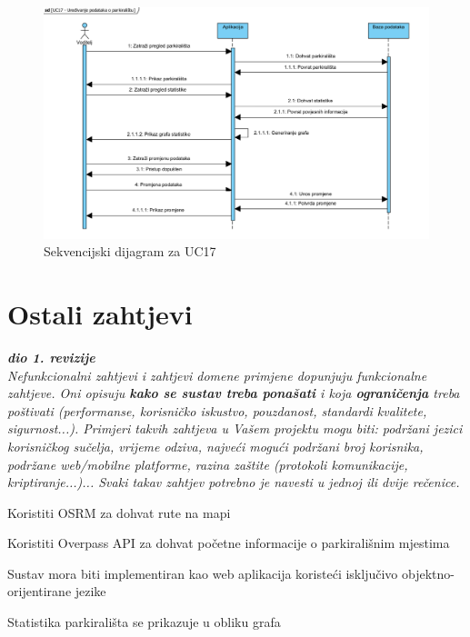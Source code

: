 				\vspace{1cm}
				
				\begin{figure}[H]
					\centering
					\includegraphics[width=\textwidth]{slike/SD_UC17.JPG} 
					\caption{Sekvencijski dijagram za UC17}
					\label{fig:promjene11} 
				\end{figure}
				\eject
	
		\section{Ostali zahtjevi}
		
			\textbf{\textit{dio 1. revizije}}\\
		 
			 \textit{Nefunkcionalni zahtjevi i zahtjevi domene primjene dopunjuju funkcionalne zahtjeve. Oni opisuju \textbf{kako se sustav treba ponašati} i koja \textbf{ograničenja} treba poštivati (performanse, korisničko iskustvo, pouzdanost, standardi kvalitete, sigurnost...). Primjeri takvih zahtjeva u Vašem projektu mogu biti: podržani jezici korisničkog sučelja, vrijeme odziva, najveći mogući podržani broj korisnika, podržane web/mobilne platforme, razina zaštite (protokoli komunikacije, kriptiranje...)... Svaki takav zahtjev potrebno je navesti u jednoj ili dvije rečenice.}
			 \begin{packed_enum}

				\item Koristiti OSRM za dohvat rute na mapi
				\item Koristiti Overpass API za dohvat početne informacije o parkirališnim mjestima
				\item Sustav mora biti implementiran kao web aplikacija koristeći isključivo objektno-orijentirane jezike
				\item Statistika parkirališta se prikazuje u obliku grafa
				
			 \end{packed_enum}
			 
			 